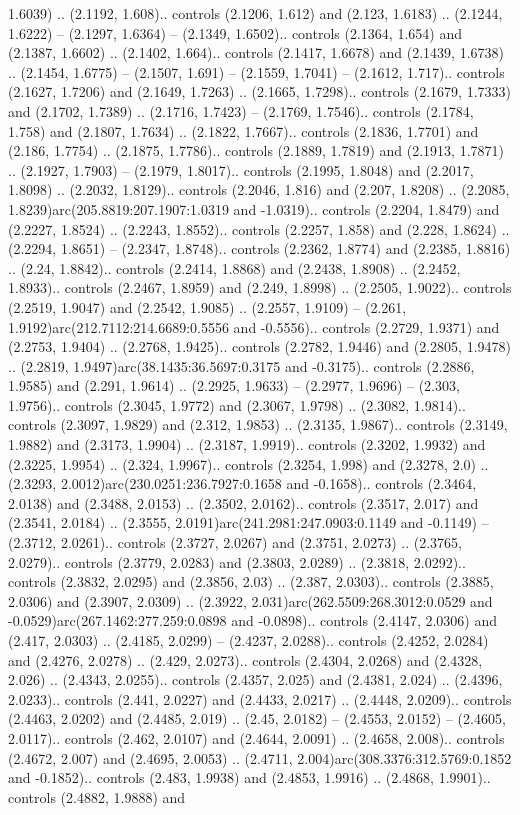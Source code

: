 1.6039) .. (2.1192, 1.608).. controls (2.1206, 1.612) and (2.123, 1.6183) .. (2.1244, 1.6222) -- (2.1297, 1.6364) -- (2.1349, 1.6502).. controls (2.1364, 1.654) and (2.1387, 1.6602) .. (2.1402, 1.664).. controls (2.1417, 1.6678) and (2.1439, 1.6738) .. (2.1454, 1.6775) -- (2.1507, 1.691) -- (2.1559, 1.7041) -- (2.1612, 1.717).. controls (2.1627, 1.7206) and (2.1649, 1.7263) .. (2.1665, 1.7298).. controls (2.1679, 1.7333) and (2.1702, 1.7389) .. (2.1716, 1.7423) -- (2.1769, 1.7546).. controls (2.1784, 1.758) and (2.1807, 1.7634) .. (2.1822, 1.7667).. controls (2.1836, 1.7701) and (2.186, 1.7754) .. (2.1875, 1.7786).. controls (2.1889, 1.7819) and (2.1913, 1.7871) .. (2.1927, 1.7903) -- (2.1979, 1.8017).. controls (2.1995, 1.8048) and (2.2017, 1.8098) .. (2.2032, 1.8129).. controls (2.2046, 1.816) and (2.207, 1.8208) .. (2.2085, 1.8239)arc(205.8819:207.1907:1.0319 and -1.0319).. controls (2.2204, 1.8479) and (2.2227, 1.8524) .. (2.2243, 1.8552).. controls (2.2257, 1.858) and (2.228, 1.8624) .. (2.2294, 1.8651) -- (2.2347, 1.8748).. controls (2.2362, 1.8774) and (2.2385, 1.8816) .. (2.24, 1.8842).. controls (2.2414, 1.8868) and (2.2438, 1.8908) .. (2.2452, 1.8933).. controls (2.2467, 1.8959) and (2.249, 1.8998) .. (2.2505, 1.9022).. controls (2.2519, 1.9047) and (2.2542, 1.9085) .. (2.2557, 1.9109) -- (2.261, 1.9192)arc(212.7112:214.6689:0.5556 and -0.5556).. controls (2.2729, 1.9371) and (2.2753, 1.9404) .. (2.2768, 1.9425).. controls (2.2782, 1.9446) and (2.2805, 1.9478) .. (2.2819, 1.9497)arc(38.1435:36.5697:0.3175 and -0.3175).. controls (2.2886, 1.9585) and (2.291, 1.9614) .. (2.2925, 1.9633) -- (2.2977, 1.9696) -- (2.303, 1.9756).. controls (2.3045, 1.9772) and (2.3067, 1.9798) .. (2.3082, 1.9814).. controls (2.3097, 1.9829) and (2.312, 1.9853) .. (2.3135, 1.9867).. controls (2.3149, 1.9882) and (2.3173, 1.9904) .. (2.3187, 1.9919).. controls (2.3202, 1.9932) and (2.3225, 1.9954) .. (2.324, 1.9967).. controls (2.3254, 1.998) and (2.3278, 2.0) .. (2.3293, 2.0012)arc(230.0251:236.7927:0.1658 and -0.1658).. controls (2.3464, 2.0138) and (2.3488, 2.0153) .. (2.3502, 2.0162).. controls (2.3517, 2.017) and (2.3541, 2.0184) .. (2.3555, 2.0191)arc(241.2981:247.0903:0.1149 and -0.1149) -- (2.3712, 2.0261).. controls (2.3727, 2.0267) and (2.3751, 2.0273) .. (2.3765, 2.0279).. controls (2.3779, 2.0283) and (2.3803, 2.0289) .. (2.3818, 2.0292).. controls (2.3832, 2.0295) and (2.3856, 2.03) .. (2.387, 2.0303).. controls (2.3885, 2.0306) and (2.3907, 2.0309) .. (2.3922, 2.031)arc(262.5509:268.3012:0.0529 and -0.0529)arc(267.1462:277.259:0.0898 and -0.0898).. controls (2.4147, 2.0306) and (2.417, 2.0303) .. (2.4185, 2.0299) -- (2.4237, 2.0288).. controls (2.4252, 2.0284) and (2.4276, 2.0278) .. (2.429, 2.0273).. controls (2.4304, 2.0268) and (2.4328, 2.026) .. (2.4343, 2.0255).. controls (2.4357, 2.025) and (2.4381, 2.024) .. (2.4396, 2.0233).. controls (2.441, 2.0227) and (2.4433, 2.0217) .. (2.4448, 2.0209).. controls (2.4463, 2.0202) and (2.4485, 2.019) .. (2.45, 2.0182) -- (2.4553, 2.0152) -- (2.4605, 2.0117).. controls (2.462, 2.0107) and (2.4644, 2.0091) .. (2.4658, 2.008).. controls (2.4672, 2.007) and (2.4695, 2.0053) .. (2.4711, 2.004)arc(308.3376:312.5769:0.1852 and -0.1852).. controls (2.483, 1.9938) and (2.4853, 1.9916) .. (2.4868, 1.9901).. controls (2.4882, 1.9888) and 